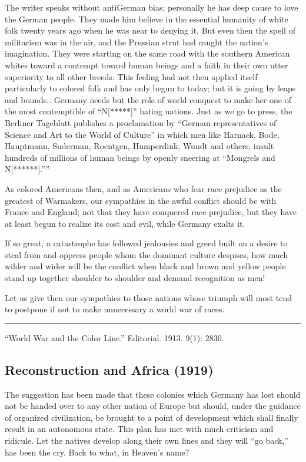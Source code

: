 \documentclass[letterpaper,10pt,english]{jupyterBook}
\begin{document}
\sphinxAtStartPar
The writer speaks without anti\sphinxhyphen{}German bias; personally he has deep cause to love the German people. They made him believe in the essential humanity of white folk twenty years ago when he was near to denying it. But even then the spell of militarism was in the air, and the Prussian strut had caught the nation’s imagination. They were starting on the same road with the southern American whites toward a contempt toward human beings and a faith in their own utter superiority to all other breeds. This feeling had not then applied itself particularly to colored folk and has only begun to to\sphinxhyphen{}day; but it is going by leaps and bounds.. Germany needs but the role of world conquest to make her one of the most contemptible of “N{[}*****{]}” hating nations. Just as we go to press, the Berliner Tageblatt publishes a proclamation by “German representatives of Science and Art to the World of Culture” in which men like Harnack, Bode, Hauptmann, Suderman, Roentgen, Humperdink, Wundt and others, insult hundreds of millions of human beings by openly sneering at “Mongrels and N{[}******{]}.””

\sphinxAtStartPar
As colored Americans then, and as Americans who fear race prejudice as the greatest of War\sphinxhyphen{}makers, our sympathies in the awful conflict should be with France and England; not that they have conquered race prejudice, but they have at least begun to realize its cost and evil, while Germany exalts it.

\sphinxAtStartPar
If so great, a catastrophe has followed jealousies and greed built on a desire to steal from and oppress people whom the dominant culture despises, how much wilder and wider will be the conflict when black and brown and yellow people stand up together shoulder to shoulder and demand recognition as men!

\sphinxAtStartPar
Let us give then our sympathies to those nations whose triumph will most tend to postpone if not to make unnecessary a world war of races.


\bigskip\hrule\bigskip


\sphinxAtStartPar
“World War and the Color Line.” Editorial. 1913.  9(1): 28\sphinxhyphen{}30.


\subsection{Reconstruction and Africa (1919)}
\label{\detokenize{Volumes/17/04/reconstruction_and_africa:reconstruction-and-africa-1919}}\label{\detokenize{Volumes/17/04/reconstruction_and_africa::doc}}
\ignorespaces 
{}\ignorespaces 
\sphinxAtStartPar
The suggestion has been made that these colonies which Germany has lost should not be handed over to any other nation of Europe but should, under the guidance of organized civilization, be brought to a point of development which shall finally result in an autonomous state. This plan has met with much criticism and ridicule. Let the natives develop along their own lines and they will “go back,” has been the cry. Back to what, in Heaven’s name?
\end{document}
